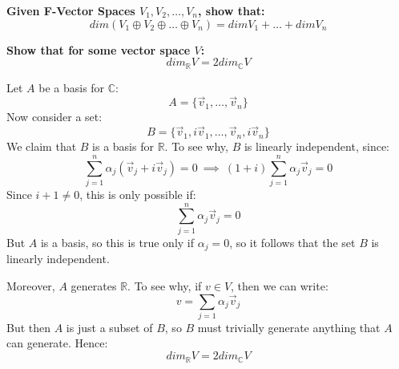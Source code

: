 \documentclass{exam}
\begin{document}
\begin{questions}

\question \textbf{Given F-Vector Spaces $V_1, V_2, \ldots, V_n$, show that:
\[
dim(V_1 \oplus V_2 \oplus \ldots \oplus V_n) = dim V_1 + \ldots + dim V_n
\]}

\bigskip

\question \textbf{Show that for some vector space $V$:
\[
dim_{\mathbb{R}}V = 2 dim_{\mathbb{C}}V
\]}

Let $A$ be a basis for $\mathbb{C}$:
\[
A = \{\vec{v}_1, \ldots, \vec{v}_n\}
\]
Now consider a set:
\[
B = \{\vec{v}_1, i\vec{v}_1, \ldots, \vec{v}_n, i\vec{v}_n\}
\]
We claim that $B$ is a basis for $\mathbb{R}$. To see why, $B$ is linearly independent, since:
\[
\sum_{j = 1}^n \alpha_j(\vec{v}_j + i\vec{v}_j) = 0 \ \implies \ (1+i)\sum_{j = 1}^n \alpha_j\vec{v}_j = 0
\]
Since $i+1 \neq 0$, this is only possible if:
\[
\sum_{j = 1}^n \alpha_j\vec{v}_j = 0
\]
But $A$ is a basis, so this is true only if $\alpha_j = 0$, so it follows that the set $B$ is linearly independent.

Moreover, $A$ generates $\mathbb{R}$. To see why, if $v \in V$, then we can write:
\[
v = \sum_{j = 1}\alpha_j\vec{v}_j
\]
But then $A$ is just a subset of $B$, so $B$ must trivially generate anything that $A$ can generate. Hence:
\[
dim_{\mathbb{R}}V = 2 dim_{\mathbb{C}}V
\]

\end{questions}
\end{document}
